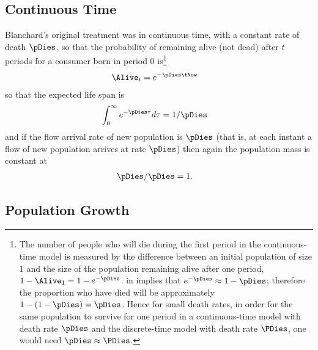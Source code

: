\documentclass{handout}
\begin{document}
\subsection{Continuous Time}

Blanchard's original treatment was in continuous time, with a constant
rate of death $\pDies$, so that the probability of remaining alive (not dead)
after $t$ periods for a consumer born in period 0 is\footnote{The number of people who will die during the first period in the continuous-time model is measured by the difference between an initial 
population of size 1 and the size of the population remaining alive after one period, $1-\Alive_{1}=1-e^{-\pDies}$.  \ExpEps in {\MathFactsList} implies that $e^{-\pDies} \approx 1-\pDies$; therefore the proportion who have died will be approximately $1-(1- \pDies)=\pDies$.  Hence for small death rates, in order for the same population to survive for one period in a continuous-time model with death rate $\pDies$ and the discrete-time model with death rate $\PDies$, one would need $\pDies \approx \PDies$.}
\begin{equation}\begin{gathered}\begin{aligned}
  \Alive_{t} & =  e^{-\pDies \tNow}
\end{aligned}\end{gathered}\end{equation}
so that the expected life span is 
\begin{equation}\begin{gathered}\begin{aligned}
  \int_{0}^{\infty} e^{-\pDies \tau} d\tau & =  1/\pDies
\end{aligned}\end{gathered}\end{equation}
and if the flow arrival rate of new population is $\pDies$ (that is, at each instant a flow of new population arrives at rate $\pDies$) then again the population
mass is constant at 
\begin{equation}\begin{gathered}\begin{aligned}
  \pDies/\pDies & =  1.
\end{aligned}\end{gathered}\end{equation}

\subsection{Population Growth}
\end{document}
